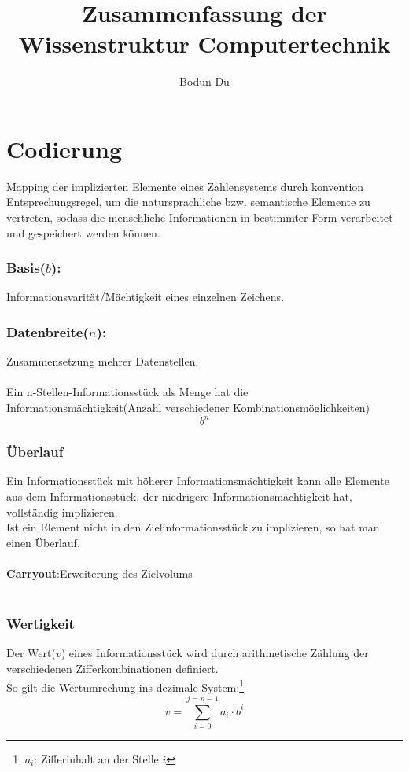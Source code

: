 \documentclass{article}
\title{Zusammenfassung der Wissenstruktur Computertechnik}
\author{Bodun Du}
\begin{document}
    \maketitle
    \pagebreak
    \tableofcontents
    \pagebreak
    \section{Codierung}
    Mapping der implizierten Elemente eines Zahlensystems durch konvention Entsprechungsregel, um die natursprachliche bzw. semantische Elemente zu vertreten, sodass die menschliche Informationen in bestimmter Form verarbeitet und gespeichert werden können.
    \subsubsection*{Basis($b$):}
    Informationsvarität/Mächtigkeit eines einzelnen Zeichens.\\
   
    \subsubsection*{Datenbreite($n$):}
    Zusammensetzung mehrer Datenstellen.\\\\
    Ein n-Stellen-Informationsstück als Menge hat die Informationsmächtigkeit(Anzahl verschiedener Kombinationsmöglichkeiten)$$b^n$$

    \subsubsection*{Überlauf}
    Ein Informationsstück mit höherer Informationsmächtigkeit kann alle Elemente aus dem Informationsstück, der niedrigere Informationsmächtigkeit hat, vollständig implizieren.\\
    Ist ein Element nicht in den Zielinformationsstück zu implizieren, so hat man einen Überlauf.\\\\
    \textbf{Carryout}:Erweiterung des Zielvolums\\\\
    \subsubsection*{Wertigkeit}
    Der Wert($v$) eines Informationsstück wird durch arithmetische Zählung der verschiedenen Zifferkombinationen definiert.\\
    So gilt die Wertumrechung ins dezimale System:\footnote{$a_i$: Zifferinhalt an der Stelle $i$}
    $$v=\sum_{i=0}^{j=n-1}a_i\cdot b^i$$
    \pagebreak
\end{document}
